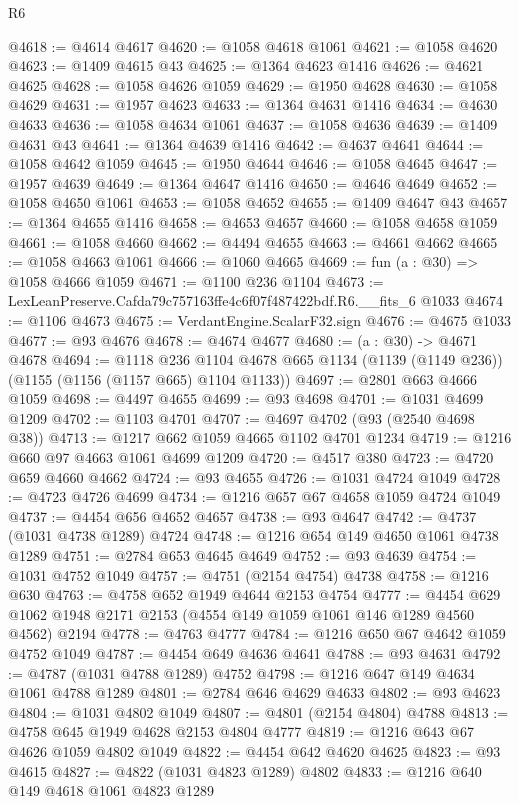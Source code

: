 \begin{lexlean}{R6}
\begin{coremodule}
@4618 := @4614 @4617
@4620 := @1058 @4618 @1061
@4621 := @1058 @4620
@4623 := @1409 @4615 @43
@4625 := @1364 @4623 @1416
@4626 := @4621 @4625
@4628 := @1058 @4626 @1059
@4629 := @1950 @4628
@4630 := @1058 @4629
@4631 := @1957 @4623
@4633 := @1364 @4631 @1416
@4634 := @4630 @4633
@4636 := @1058 @4634 @1061
@4637 := @1058 @4636
@4639 := @1409 @4631 @43
@4641 := @1364 @4639 @1416
@4642 := @4637 @4641
@4644 := @1058 @4642 @1059
@4645 := @1950 @4644
@4646 := @1058 @4645
@4647 := @1957 @4639
@4649 := @1364 @4647 @1416
@4650 := @4646 @4649
@4652 := @1058 @4650 @1061
@4653 := @1058 @4652
@4655 := @1409 @4647 @43
@4657 := @1364 @4655 @1416
@4658 := @4653 @4657
@4660 := @1058 @4658 @1059
@4661 := @1058 @4660
@4662 := @4494 @4655
@4663 := @4661 @4662
@4665 := @1058 @4663 @1061
@4666 := @1060 @4665
@4669 := fun (a : @30) => @1058 @4666 @1059
@4671 := @1100 @236 @1104
@4673 := LexLeanPreserve.Cafda79c757163ffe4c6f07f487422bdf.R6.__fits_6 @1033
@4674 := @1106 @4673
@4675 := VerdantEngine.ScalarF32.sign
@4676 := @4675 @1033
@4677 := @93 @4676
@4678 := @4674 @4677
@4680 := (a : @30) -> @4671 @4678
@4694 := @1118
    @236
    @1104
    @4678
    @665
    @1134
    (@1139 (@1149 @236))
    (@1155 (@1156 (@1157 @665) @1104 @1133))
@4697 := @2801 @663 @4666 @1059
@4698 := @4497 @4655
@4699 := @93 @4698
@4701 := @1031 @4699 @1209
@4702 := @1103 @4701
@4707 := @4697 @4702 (@93 (@2540 @4698 @38))
@4713 := @1217 @662 @1059 @4665 @1102 @4701 @1234
@4719 := @1216 @660 @97 @4663 @1061 @4699 @1209
@4720 := @4517 @380
@4723 := @4720 @659 @4660 @4662
@4724 := @93 @4655
@4726 := @1031 @4724 @1049
@4728 := @4723 @4726 @4699
@4734 := @1216 @657 @67 @4658 @1059 @4724 @1049
@4737 := @4454 @656 @4652 @4657
@4738 := @93 @4647
@4742 := @4737 (@1031 @4738 @1289) @4724
@4748 := @1216 @654 @149 @4650 @1061 @4738 @1289
@4751 := @2784 @653 @4645 @4649
@4752 := @93 @4639
@4754 := @1031 @4752 @1049
@4757 := @4751 (@2154 @4754) @4738
@4758 := @1216 @630
@4763 := @4758 @652 @1949 @4644 @2153 @4754
@4777 := @4454 @629 @1062 @1948 @2171 @2153 (@4554 @149 @1059 @1061 @146 @1289 @4560 @4562) @2194
@4778 := @4763 @4777
@4784 := @1216 @650 @67 @4642 @1059 @4752 @1049
@4787 := @4454 @649 @4636 @4641
@4788 := @93 @4631
@4792 := @4787 (@1031 @4788 @1289) @4752
@4798 := @1216 @647 @149 @4634 @1061 @4788 @1289
@4801 := @2784 @646 @4629 @4633
@4802 := @93 @4623
@4804 := @1031 @4802 @1049
@4807 := @4801 (@2154 @4804) @4788
@4813 := @4758 @645 @1949 @4628 @2153 @4804 @4777
@4819 := @1216 @643 @67 @4626 @1059 @4802 @1049
@4822 := @4454 @642 @4620 @4625
@4823 := @93 @4615
@4827 := @4822 (@1031 @4823 @1289) @4802
@4833 := @1216 @640 @149 @4618 @1061 @4823 @1289

\end{coremodule}
\end{lexlean}

